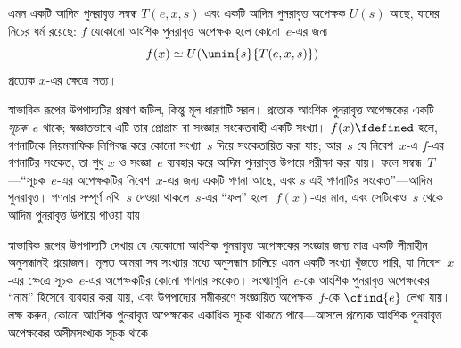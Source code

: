 \documentclass[../../../include/open-logic-section]{subfiles}
\begin{document}

\begin{thm}[ক্লিনির স্বাভাবিক রূপের উপপাদ্য]
এমন একটি আদিম পুনরাবৃত্ত সম্বন্ধ $T(e, x, s)$ এবং একটি আদিম পুনরাবৃত্ত
অপেক্ষক $U(s)$ আছে, যাদের নিচের ধর্ম রয়েছে: $f$ যেকোনো আংশিক
পুনরাবৃত্ত অপেক্ষক হলে কোনো~$e$-এর জন্য
\[
f(x) \simeq U(\umin{s}{T(e, x, s)})
\]
প্রত্যেক $x$-এর ক্ষেত্রে সত্য।
\end{thm}

\begin{explain}
স্বাভাবিক রূপের উপপাদ্যটির প্রমাণ জটিল, কিন্তু মূল ধারণাটি সরল। প্রত্যেক
আংশিক পুনরাবৃত্ত অপেক্ষকের একটি \emph{সূচক}~$e$ থাকে; স্বজ্ঞাতভাবে এটি
তার প্রোগ্রাম বা সংজ্ঞার সংকেতবাহী একটি সংখ্যা। $f(x) \fdefined$ হলে,
গণনাটিকে নিয়মমাফিক লিপিবদ্ধ করে কোনো সংখ্যা~$s$ দিয়ে সংকেতায়িত করা
যায়; আর~$s$ যে নিবেশ~$x$-এ $f$-এর গণনাটির সংকেত, তা শুধু $x$ ও
সংজ্ঞা~$e$ ব্যবহার করে আদিম পুনরাবৃত্ত উপায়ে পরীক্ষা করা যায়। ফলে
সম্বন্ধ~$T$—“সূচক~$e$-এর অপেক্ষকটির নিবেশ~$x$-এর জন্য একটি গণনা আছে,
এবং $s$ এই গণনাটির সংকেত”—আদিম পুনরাবৃত্ত। গণনার সম্পূর্ণ নথি~$s$
দেওয়া থাকলে~$s$-এর “ফল” হলো~$f(x)$-এর মান, এবং সেটিকেও~$s$ থেকে আদিম
পুনরাবৃত্ত উপায়ে পাওয়া যায়।

স্বাভাবিক রূপের উপপাদ্যটি দেখায় যে যেকোনো আংশিক পুনরাবৃত্ত অপেক্ষকের
সংজ্ঞার জন্য মাত্র একটি সীমাহীন অনুসন্ধানই প্রয়োজন। মূলত আমরা সব সংখ্যার
মধ্যে অনুসন্ধান চালিয়ে এমন একটি সংখ্যা খুঁজতে পারি, যা নিবেশ~$x$-এর
ক্ষেত্রে সূচক~$e$-এর অপেক্ষকটির কোনো গণনার সংকেত। সংখ্যাগুলি~$e$-কে
আংশিক পুনরাবৃত্ত অপেক্ষকের “নাম” হিসেবে ব্যবহার করা যায়, এবং উপপাদ্যের
সমীকরণে সংজ্ঞায়িত অপেক্ষক~$f$-কে $\cfind{e}$ লেখা যায়। লক্ষ করুন,
কোনো আংশিক পুনরাবৃত্ত অপেক্ষকের একাধিক সূচক থাকতে পারে—আসলে প্রত্যেক
আংশিক পুনরাবৃত্ত অপেক্ষকের অসীমসংখ্যক সূচক থাকে।
\end{explain}
\end{document}
